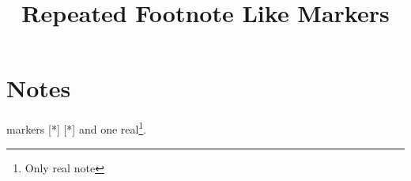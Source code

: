 \documentclass{article}
\begin{document}
\title{Repeated Footnote Like Markers}\maketitle
\section{Notes} markers [*] [*] and one real\footnote{Only real note}.
\end{document}
